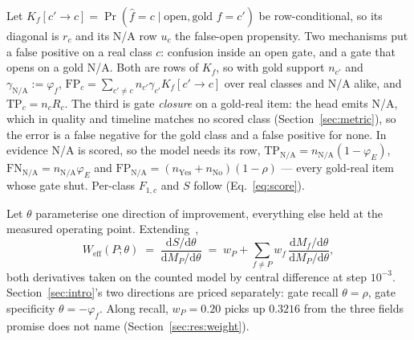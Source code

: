  Let
$K_f[c'{\to}c]=\Pr(\hat{f}{=}c\mid\text{open},\text{gold }f{=}c')$ be row-conditional, so its
diagonal is $r_c$ and its N/A row $u_c$ the false-open propensity. Two mechanisms put a false
positive on a real class $c$: confusion inside an open gate, and a gate that opens on a gold N/A.
Both are rows of $K_f$, so with gold support $n_{c'}$ and $\gamma_{\text{N/A}}{:=}\varphi_f$,
$\mathrm{FP}_c = \sum_{c'\neq c} n_{c'}\gamma_{c'}K_f[c'{\to}c]$ over real classes and N/A alike,
and $\mathrm{TP}_c=n_cR_c$. The third is gate \emph{closure} on a gold-real item: the head emits
N/A, which in quality and timeline matches no scored class
(Section~\ref{sec:metric}), so the error is a false negative for the gold class and a false
positive for none. In evidence N/A is scored, so the model needs its row,
$\mathrm{TP}_{\text{N/A}}=n_{\text{N/A}}(1{-}\varphi_E)$,
$\mathrm{FN}_{\text{N/A}}=n_{\text{N/A}}\varphi_E$ and
$\mathrm{FP}_{\text{N/A}}=(n_{\text{Yes}}{+}n_{\text{No}})(1{-}\rho)$ --- every gold-real item
whose gate shut. Per-class $F_{1,c}$ and $S$ follow (Eq.~\eqref{eq:score}).

 Let $\theta$ parameterise one direction of improvement, everything else
held at the measured operating point. Extending~\cite{wang1970differential},
\begin{equation}
W_{\mathrm{eff}}(P;\theta)\;=\;\frac{\mathrm{d}S/\mathrm{d}\theta}{\mathrm{d}M_P/\mathrm{d}\theta}
\;=\;w_P+\sum_{f\neq P} w_f\,
\frac{\mathrm{d}M_f/\mathrm{d}\theta}{\mathrm{d}M_P/\mathrm{d}\theta},
\label{eq:weff}
\end{equation}
both derivatives taken on the counted model by central difference at step $10^{-3}$. Section~\ref{sec:intro}'s
two directions are priced separately: gate recall $\theta{=}\rho$, gate specificity
$\theta{=}-\varphi_f$. Along recall, $w_P{=}0.20$ picks up $0.3216$ from the
three fields promise does not name (Section~\ref{sec:res:weight}).

